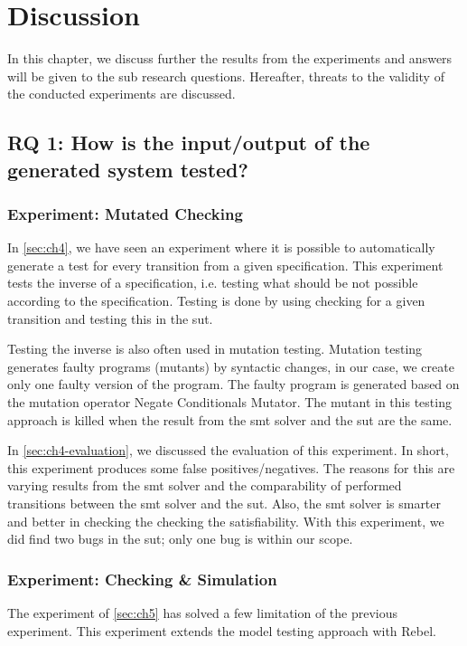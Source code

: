 \chapter{Discussion}

In this chapter, we discuss further the results from the experiments and answers will be given to the sub research questions. Hereafter, threats to the validity of the conducted experiments are discussed.

\section{RQ 1: How is the input/output of the generated system tested?}

\subsection{Experiment: Mutated Checking}
In \autoref{sec:ch4}, we have seen an experiment where it is possible to automatically generate a test for every transition from a given specification. This experiment tests the inverse of a specification, i.e. testing what should be not possible according to the specification. Testing is done by using checking for a given transition and testing this in the \gls{sut}.

Testing the inverse is also often used in mutation testing. Mutation testing generates faulty programs (mutants) by syntactic changes, in our case, we create only one faulty version of the program. The faulty program is generated based on the mutation operator Negate Conditionals Mutator. The mutant in this testing approach is killed when the result from the \gls{smt} solver and the \gls{sut} are the same.

In \autoref{sec:ch4-evaluation}, we discussed the evaluation of this experiment. In short, this experiment produces some false positives/negatives. The reasons for this are varying results from the \gls{smt} solver and the comparability of performed transitions between the \gls{smt} solver and the \gls{sut}. Also, the \gls{smt} solver is smarter and better in checking the checking the satisfiability. With this experiment, we did find two bugs in the \gls{sut}; only one bug is within our scope.


\subsection{Experiment: Checking & Simulation}
The experiment of \autoref{sec:ch5} has solved a few limitation of the previous experiment. This experiment extends the model testing approach with Rebel.

